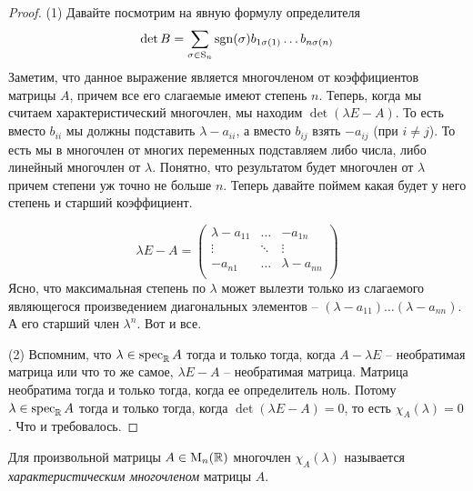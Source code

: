 \begin{proof}
(1) Давайте посмотрим на явную формулу определителя
\[
\det B = \sum_{\sigma\in\operatorname{S}_{n}}\operatorname{sgn}(\sigma) b_{1\sigma(1)}\ldots b_{n\sigma(n)}
\]
Заметим, что данное выражение является многочленом от коэффициентов матрицы $A$, причем все его слагаемые имеют степень $n$.
Теперь, когда мы считаем характеристический многочлен, мы находим $\det(\lambda E - A)$.
То есть вместо $b_{ii}$ мы должны подставить  $\lambda - a_{ii}$, а вместо $b_{ij}$ взять $-a_{ij}$ (при $i\neq j$).
То есть мы в многочлен от многих переменных подставляем либо числа, либо линейный многочлен от $\lambda$.
Понятно, что результатом будет многочлен от $\lambda$ причем степени уж точно не больше $n$.
Теперь давайте поймем какая будет у него степень и старший коэффициент.

\[
\lambda E - A = 
\begin{pmatrix}
{\lambda - a_{11}}&{\ldots}&{-a_{1n}}\\
{\vdots}&{\ddots}&{\vdots}\\
{-a_{n1}}&{\ldots}&{\lambda - a_{nn}}\\
\end{pmatrix}
\]
Ясно, что максимальная степень по $\lambda$ может вылезти только из слагаемого являющегося произведением диагональных элементов -- $(\lambda - a_{11}) \ldots (\lambda - a_{nn})$.
А его старший член $\lambda^n$.
Вот и все.

(2) Вспомним, что $\lambda\in\operatorname{spec}_\mathbb R A$ тогда и только тогда, когда $A - \lambda E$ -- необратимая матрица или что то же самое,  $\lambda E - A$ -- необратимая матрица.
Матрица необратима тогда и только тогда, когда ее определитель ноль.
Потому $\lambda \in\operatorname{spec}_\mathbb R A$ тогда и только тогда, когда $\det (\lambda E - A) = 0$, то есть $\chi_A(\lambda) = 0$.
Что и требовалось.
\end{proof}

\begin{definition}
Для произвольной матрицы $A\in\operatorname{M}_{n}(\mathbb R)$ многочлен $\chi_A(\lambda)$ называется {\it характеристическим многочленом} матрицы $A$.
\end{definition}



